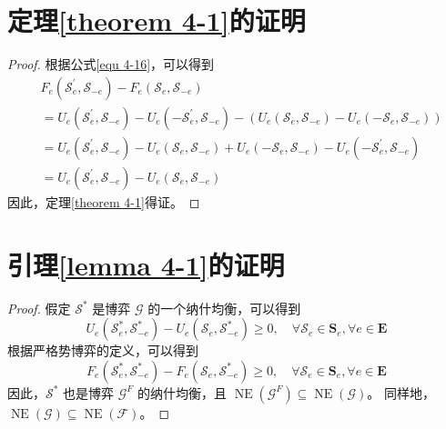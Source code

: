 \section{定理\ref{theorem 4-1}的证明}
\label{appendix f}
\begin{proof} 根据公式\ref{equ 4-16}，可以得到
\begin{equation}
	\begin{aligned}
		&{F}_{e}\left(\mathcal{{S}}^{\prime}_{e}, \mathcal{S}_{-e}\right) - {F}_{e}\left(\mathcal{S}_{e}, \mathcal{S}_{-e}\right) \\
		&={U}_{e}\left(\mathcal{S}^{\prime}_{e}, \mathcal{S}_{-e}\right) - {U}_{e}\left(-\mathcal{S}^{\prime}_{e}, \mathcal{S}_{-e}\right) - \left( {U}_{e}\left(\mathcal{S}_{e}, \mathcal{S}_{-e}\right) - {U}_{e}\left(-\mathcal{S}_{e}, \mathcal{S}_{-e}\right) \right)\\
		&={U}_{e}\left(\mathcal{S}^{\prime}_{e}, \mathcal{S}_{-e}\right) - {U}_{e}\left(\mathcal{S}_{e}, \mathcal{S}_{-e}\right) + {U}_{e}\left(-\mathcal{S}_{e}, \mathcal{S}_{-e}\right) - {U}_{e}\left(-\mathcal{S}^{\prime}_{e}, \mathcal{S}_{-e}\right)\\
		&={U}_{e}\left(\mathcal{S}^{\prime}_{e}, \mathcal{S}_{-e}\right) - {U}_{e}\left(\mathcal{S}_{e}, \mathcal{S}_{-e}\right)
	\end{aligned}
\end{equation}
因此，定理\ref{theorem 4-1}得证。
\end{proof}

\section{引理\ref{lemma 4-1}的证明}
\label{appendix g}
\begin{proof}
假定 $\mathcal{S}^{*}$ 是博弈 $\mathcal{G}$ 的一个纳什均衡，可以得到
\begin{equation}
	U_{e}\left(\mathcal{S}_{e}^{*}, \mathcal{S}_{-e}^{*}\right) - U_{e}\left(\mathcal{S}_{e}, \mathcal{S}_{-e}^{*}\right) \geq 0, \quad \forall \mathcal{S}_{e} \in \mathbf{S}_{e}, \forall e \in \mathbf{E}
\end{equation}
根据严格势博弈的定义，可以得到
\begin{equation}
	F_{e}\left(\mathcal{S}_{e}^{*}, \mathcal{S}_{-e}^{*}\right) - F_{e}\left(\mathcal{S}_{e}, \mathcal{S}_{-e}^{*}\right) \geq 0, \quad \forall \mathcal{S}_{e} \in \mathbf{S}_{e}, \forall e \in \mathbf{E}
\end{equation}
因此，$\mathcal{S}^{*}$ 也是博弈 $\mathcal{G}^{F}$ 的纳什均衡，且 $\operatorname{NE}(\mathcal{G}^{F}) \subseteq \operatorname{NE}(\mathcal{G})$。
同样地，$\operatorname{NE}(\mathcal{G}) \subseteq \operatorname{NE}(\mathcal{F})$。
\end{proof}

